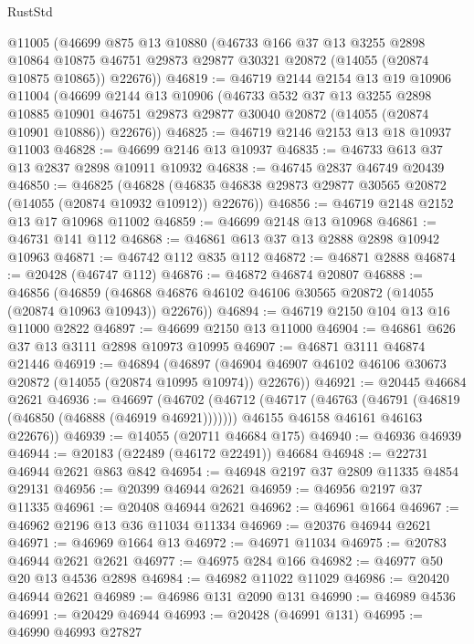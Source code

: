 \begin{lexlean}{RustStd}
\begin{coremodule}
    @11005
    (@46699
      @875
      @13
      @10880
      (@46733
        @166
        @37
        @13
        @3255
        @2898
        @10864
        @10875
        @46751
        @29873
        @29877
        @30321
        @20872
        (@14055 (@20874 @10875 @10865))
        @22676))
@46819 := @46719
    @2144
    @2154
    @13
    @19
    @10906
    @11004
    (@46699
      @2144
      @13
      @10906
      (@46733
        @532
        @37
        @13
        @3255
        @2898
        @10885
        @10901
        @46751
        @29873
        @29877
        @30040
        @20872
        (@14055 (@20874 @10901 @10886))
        @22676))
@46825 := @46719 @2146 @2153 @13 @18 @10937 @11003
@46828 := @46699 @2146 @13 @10937
@46835 := @46733 @613 @37 @13 @2837 @2898 @10911 @10932
@46838 := @46745 @2837 @46749 @20439
@46850 := @46825
    (@46828 (@46835 @46838 @29873 @29877 @30565 @20872 (@14055 (@20874 @10932 @10912)) @22676))
@46856 := @46719 @2148 @2152 @13 @17 @10968 @11002
@46859 := @46699 @2148 @13 @10968
@46861 := @46731 @141 @112
@46868 := @46861 @613 @37 @13 @2888 @2898 @10942 @10963
@46871 := @46742 @112 @835 @112
@46872 := @46871 @2888
@46874 := @20428 (@46747 @112)
@46876 := @46872 @46874 @20807
@46888 := @46856
    (@46859 (@46868 @46876 @46102 @46106 @30565 @20872 (@14055 (@20874 @10963 @10943)) @22676))
@46894 := @46719 @2150 @104 @13 @16 @11000 @2822
@46897 := @46699 @2150 @13 @11000
@46904 := @46861 @626 @37 @13 @3111 @2898 @10973 @10995
@46907 := @46871 @3111 @46874 @21446
@46919 := @46894
    (@46897 (@46904 @46907 @46102 @46106 @30673 @20872 (@14055 (@20874 @10995 @10974)) @22676))
@46921 := @20445 @46684 @2621
@46936 := @46697
    (@46702
      (@46712
        (@46717 (@46763 (@46791 (@46819 (@46850 (@46888 (@46919 @46921)))))))
        @46155
        @46158
        @46161
        @46163
        @22676))
@46939 := @14055 (@20711 @46684 @175)
@46940 := @46936 @46939
@46944 := @20183 (@22489 (@46172 @22491)) @46684
@46948 := @22731 @46944 @2621 @863 @842
@46954 := @46948 @2197 @37 @2809 @11335 @4854 @29131
@46956 := @20399 @46944 @2621
@46959 := @46956 @2197 @37 @11335
@46961 := @20408 @46944 @2621
@46962 := @46961 @1664
@46967 := @46962 @2196 @13 @36 @11034 @11334
@46969 := @20376 @46944 @2621
@46971 := @46969 @1664 @13
@46972 := @46971 @11034
@46975 := @20783 @46944 @2621 @2621
@46977 := @46975 @284 @166
@46982 := @46977 @50 @20 @13 @4536 @2898
@46984 := @46982 @11022 @11029
@46986 := @20420 @46944 @2621
@46989 := @46986 @131 @2090 @131
@46990 := @46989 @4536
@46991 := @20429 @46944
@46993 := @20428 (@46991 @131)
@46995 := @46990 @46993 @27827

\end{coremodule}
\end{lexlean}
